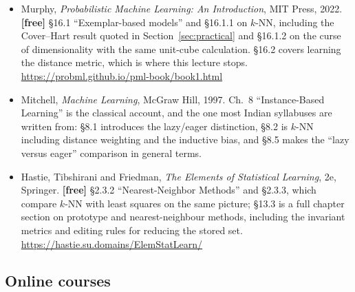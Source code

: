 \documentclass[11pt]{article}
\begin{document}
\begin{itemize}[leftmargin=*]
  \item Murphy, \emph{Probabilistic Machine Learning: An Introduction}, MIT
    Press, 2022. \textbf{[free]} \S16.1 ``Exemplar-based models'' and
    \S16.1.1 on $k$-NN, including the Cover--Hart result quoted in
    Section~\ref{sec:practical} and \S16.1.2 on the curse of dimensionality
    with the same unit-cube calculation. \S16.2 covers learning the distance
    metric, which is where this lecture stops.
    \url{https://probml.github.io/pml-book/book1.html}
  \item Mitchell, \emph{Machine Learning}, McGraw Hill, 1997. Ch.~8
    ``Instance-Based Learning'' is the classical account, and the one most
    Indian syllabuses are written from: \S8.1 introduces the lazy/eager
    distinction, \S8.2 is $k$-NN including distance weighting and the
    inductive bias, and \S8.5 makes the ``lazy versus eager'' comparison in
    general terms.
  \item Hastie, Tibshirani and Friedman, \emph{The Elements of Statistical
    Learning}, 2e, Springer. \textbf{[free]} \S2.3.2 ``Nearest-Neighbor
    Methods'' and \S2.3.3, which compare $k$-NN with least squares on the same
    picture; \S13.3 is a full chapter section on prototype and
    nearest-neighbour methods, including the invariant metrics and editing
    rules for reducing the stored set.
    \url{https://hastie.su.domains/ElemStatLearn/}
\end{itemize}

\subsection*{Online courses}
\end{document}
